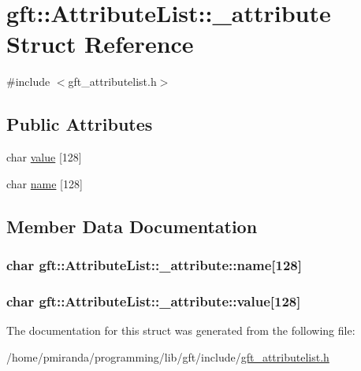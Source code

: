 \hypertarget{structgft_1_1AttributeList_1_1__attribute}{}\section{gft\+:\+:Attribute\+List\+:\+:\+\_\+attribute Struct Reference}
\label{structgft_1_1AttributeList_1_1__attribute}


{\ttfamily \#include $<$gft\+\_\+attributelist.\+h$>$}

\subsection*{Public Attributes}
\begin{DoxyCompactItemize}
\item 
char \hyperlink{structgft_1_1AttributeList_1_1__attribute_afea36de6cef292d2183e5b213b19257c}{value} \mbox{[}128\mbox{]}
\item 
char \hyperlink{structgft_1_1AttributeList_1_1__attribute_acbc8ffc932dae141d8bc43cd364bae7b}{name} \mbox{[}128\mbox{]}
\end{DoxyCompactItemize}


\subsection{Member Data Documentation}
\subsubsection[{\texorpdfstring{name}{name}}]{\setlength{\rightskip}{0pt plus 5cm}char gft\+::\+Attribute\+List\+::\+\_\+attribute\+::name\mbox{[}128\mbox{]}}\hypertarget{structgft_1_1AttributeList_1_1__attribute_acbc8ffc932dae141d8bc43cd364bae7b}{}\label{structgft_1_1AttributeList_1_1__attribute_acbc8ffc932dae141d8bc43cd364bae7b}
\subsubsection[{\texorpdfstring{value}{value}}]{\setlength{\rightskip}{0pt plus 5cm}char gft\+::\+Attribute\+List\+::\+\_\+attribute\+::value\mbox{[}128\mbox{]}}\hypertarget{structgft_1_1AttributeList_1_1__attribute_afea36de6cef292d2183e5b213b19257c}{}\label{structgft_1_1AttributeList_1_1__attribute_afea36de6cef292d2183e5b213b19257c}


The documentation for this struct was generated from the following file\+:\begin{DoxyCompactItemize}
\item 
/home/pmiranda/programming/lib/gft/include/\hyperlink{gft__attributelist_8h}{gft\+\_\+attributelist.\+h}\end{DoxyCompactItemize}
